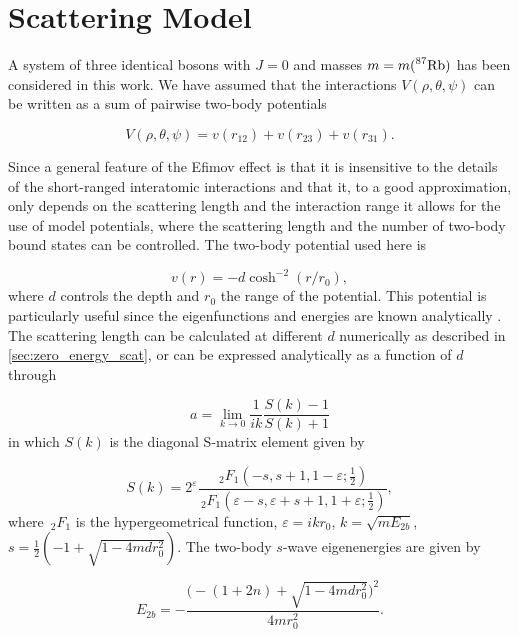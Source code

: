 \chapter{Scattering Model}\label{chapter:scattering_model}
A system of three identical bosons with $J=0$ and masses $m = m( \prescript{87}{}{\mathrm{Rb}})$ has been considered in this work. We have assumed that the interactions $V(\rho,\theta,\psi)$ can be written as a sum of pairwise two-body potentials   

\begin{equation}\label{eq:potential_sum}
V(\rho,\theta,\psi) = v(r_{12}) + v(r_{23}) + v(r_{31}).
\end{equation} 

Since a general feature of the Efimov effect is that it is insensitive to the details of the short-ranged interatomic interactions and that it, to a good approximation, only depends on the scattering length and the interaction range it allows for the use of model potentials, where the scattering length and the number of two-body bound states can be controlled. The two-body potential used here is  

\begin{equation}\label{eq:two_b_potential}
v(r) = -d\cosh^{-2}{(r/r_0)},
\end{equation}
where $d$ controls the depth and $r_0$ the range of the potential.
This potential is particularly useful since the eigenfunctions and energies are known analytically \cite{Landau1965Quantum}. The scattering length can be calculated at different $d$ numerically as described in \cref{sec:zero_energy_scat}, or can be expressed analytically as a function of $d$ through 

\begin{equation}
a = \lim_{k \to 0} \frac{1}{ik} \frac{S(k)-1}{S(k)+1}
\end{equation}
in which $S(k)$ is the diagonal S-matrix element given by

\begin{equation}
S(k) = 2^{\varepsilon} \frac{\,_2F_1(-s, s+1, 1-\varepsilon;\frac{1}{2})}{\,_2F_1(\varepsilon-s, \varepsilon + s+1, 1+\varepsilon;\frac{1}{2})},
\end{equation}
where $\,_2F_1$ is the hypergeometrical function, $\varepsilon = ikr_0$, $k = \sqrt{mE_{2b}}$, $s = \frac{1}{2}(-1 + \sqrt{1-4 m d r_0^2})$. The two-body $s$-wave eigenenergies are given by

\begin{equation}\label{eq:exact_2b}
E_{2b} = -\frac{\Big(-(1+2n)+\sqrt{1-4mdr_0^2}\Big)^2}{4mr_0^2}.
\end{equation}

